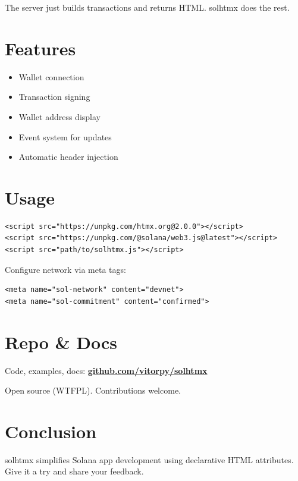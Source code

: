 \documentclass{article}
\begin{document}
The server just builds transactions and returns HTML. solhtmx does the rest.

\section{Features}

\begin{itemize}
\item Wallet connection

\item Transaction signing

\item Wallet address display

\item Event system for updates

\item Automatic header injection

\end{itemize}

\section{Usage}

\begin{verbatim}
<script src="https://unpkg.com/htmx.org@2.0.0"></script>
<script src="https://unpkg.com/@solana/web3.js@latest"></script>
<script src="path/to/solhtmx.js"></script>
\end{verbatim}

Configure network via meta tags:

\begin{verbatim}
<meta name="sol-network" content="devnet">
<meta name="sol-commitment" content="confirmed">
\end{verbatim}

\section{Repo \& Docs}

Code, examples, docs:
\textbf{\href{https://github.com/vitorpy/solhtmx}{github.com/vitorpy/solhtmx}}

Open source (WTFPL). Contributions welcome.

\section{Conclusion}

solhtmx simplifies Solana app development using declarative HTML attributes. Give it a try and share your feedback.


\end{document}
